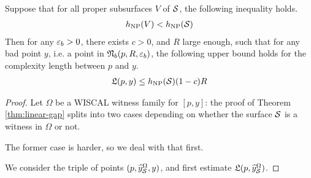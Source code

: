 \begin{theorem}
  \label{thm:linear-gap}
  Suppose that for all proper subsurfaces $V$ of $\mathcal{S}$, the following inequality holds.
  \begin{align*}
    h_{\mathrm{NP}}(V) < h_{\mathrm{NP}}(\mathcal{S})
  \end{align*}
  Then for any $\varepsilon_b > 0$, there exists $c > 0$, and $R$ large enough, such that for any bad point $y$, i.e. a point in $\mathfrak{N}_b(p, R, \varepsilon_b)$, the following upper bound holds for the complexity length between $p$ and $y$.
  \begin{align*}
    \mathfrak{L}(p, y) \leq h_{\mathrm{NP}}(\mathcal{S}) (1 - c) R
  \end{align*}
\end{theorem}

\begin{proof}


Let $\Omega$ be a WISCAL witness family for $[p, y]$: the proof of Theorem \ref{thm:linear-gap} splits into two cases depending on whether the surface $\mathcal{S}$ is a witness in $\Omega$ or not.

The former case is harder, so we deal with that first.


We consider the triple of points $(p, \widehat{y}_{\mathcal{S}}^{\Omega}, y)$, and first estimate $\mathfrak{L}(p, \widehat{y}_{\mathcal{S}}^{\Omega})$.


\end{proof}
